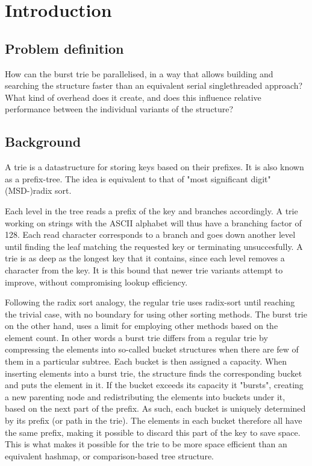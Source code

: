 \chapter{Introduction}

\section{Problem definition}
How can the burst trie be parallelised, in a way that allows building and searching
the structure faster than an equivalent serial singlethreaded approach?
What kind of overhead does it create, and does this influence relative
performance between the individual variants of the structure?


\section{Background}
A trie is a datastructure for storing keys based on their prefixes.
It is also known as a prefix-tree. The idea is equivalent to that of
"most significant digit" (MSD-)radix sort.

Each level in the tree reads a prefix of the key and branches accordingly.
A trie working on strings with the ASCII alphabet will thus have a branching
factor of 128. Each read character corresponds to a branch and goes down another
level until finding the leaf matching the requested key or terminating
unsuccesfully. A trie is as deep as the longest key that it contains, since
each level removes a character from the key. It is this bound that newer trie
variants attempt to improve, without compromising lookup efficiency.

Following the radix sort analogy, the regular trie uses radix-sort until
reaching the trivial case, with no boundary for using other sorting methods.
The burst trie on the other hand, uses a limit for employing other methods
based on the element count. In other words a burst trie differs from a regular
trie by compressing the elements into so-called bucket structures when
there are few of them in a particular subtree. Each bucket is then assigned a
capacity. When inserting elements into a burst trie, the structure finds the
corresponding bucket and puts the element in it. If the bucket exceeds its
capacity it "bursts", creating a new parenting node and redistributing the
elements into buckets under it, based on the next part of the prefix. As such,
each bucket is uniquely determined by its prefix (or path in the trie). The
elements in each bucket therefore all have the same prefix, making it possible
to discard this part of the key to save space. This is what makes it possible
for the trie to be more space efficient than an equivalent hashmap, or
    comparison-based tree structure.

